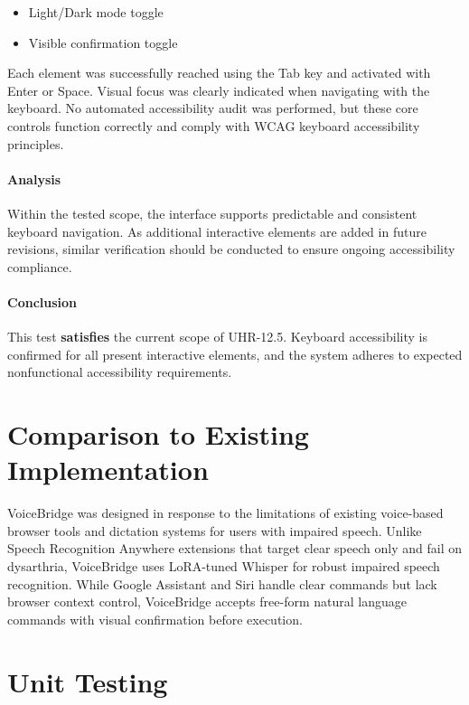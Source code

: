 \documentclass[12pt, titlepage]{article}
\begin{document}
\begin{itemize}
    \item Light/Dark mode toggle
    \item Visible confirmation toggle
\end{itemize}

Each element was successfully reached using the Tab key and activated with Enter or Space. Visual focus was clearly indicated when navigating with the keyboard. No automated accessibility audit was performed, but these core controls function correctly and comply with WCAG keyboard accessibility principles.

\paragraph{Analysis}
Within the tested scope, the interface supports predictable and consistent keyboard navigation. As additional interactive elements are added in future revisions, similar verification should be conducted to ensure ongoing accessibility compliance.

\paragraph{Conclusion}
This test \textbf{satisfies} the current scope of UHR-12.5. Keyboard accessibility is confirmed for all present interactive elements, and the system adheres to expected nonfunctional accessibility requirements.
   
\section{Comparison to Existing Implementation}  

VoiceBridge was designed in response to the limitations of existing voice-based browser tools and dictation systems for users with impaired speech. Unlike Speech Recognition Anywhere extensions that target clear speech only and fail on dysarthria, VoiceBridge uses LoRA-tuned Whisper for robust impaired speech recognition. While Google Assistant and Siri handle clear commands but lack browser context control, VoiceBridge accepts free-form natural language commands with visual confirmation before execution.
\section{Unit Testing}
\end{document}
